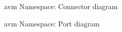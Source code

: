 \begin{figure}[h!]
\caption{avm Namespace: Connector diagram}
\label{Connector_diagram}
\end{figure}

\begin{figure}[h!]
\caption{avm Namespace: Port diagram}
\label{Port_diagram}
\end{figure}


